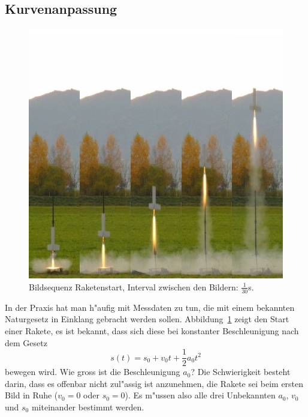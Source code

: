 %
%
\subsection{Kurvenanpassung}
\begin{figure}
\begin{center}
\includegraphics[width=0.6\hsize]{applications/stummel}
\end{center}
\caption{Bildsequenz Raketenstart, Interval zwischen den Bildern: $\frac1{30}$s.
\label{stummel}}
\end{figure}
In der Praxis hat man h"aufig mit Messdaten zu tun, die mit einem
bekannten Naturgesetz in Einklang gebracht werden sollen.
Abbildung~\ref{stummel} zeigt den Start einer Rakete, es ist
bekannt, dass sich diese bei konstanter Beschleunigung nach dem
Gesetz
\[
s(t)=s_0+v_0t+\frac12a_0t^2
\]
bewegen wird. Wie gross ist die Beschleunigung $a_0$?
Die Schwierigkeit besteht darin, dass es offenbar nicht zul"assig ist
anzunehmen, die Rakete sei beim ersten Bild in Ruhe ($v_0=0$ oder
$s_0=0$). Es m"ussen also alle drei Unbekannten $a_0$, $v_0$
und $s_0$ miteinander bestimmt werden.

